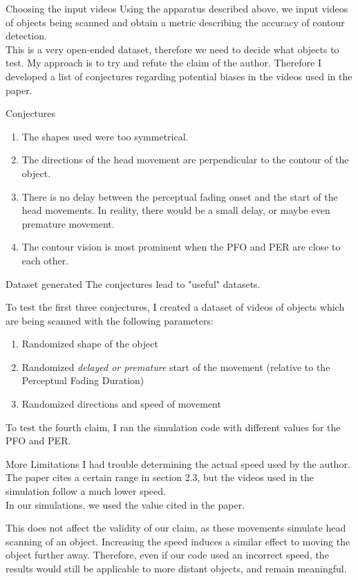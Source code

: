 \documentclass[]{beamer}
\theoremstyle{remark}
\begin{document}
\begin{frame}{Choosing the input videos}
Using the apparatus described above, we input videos of objects being scanned and obtain a metric describing the accuracy of contour detection. \\

This is a very open-ended dataset, therefore we need to decide what objects to test. My approach is to try and refute the claim of the author. Therefore I developed a list of conjectures regarding potential biases in the videos used in the paper. 
\end{frame}

\begin{frame}{Conjectures}
\begin{enumerate}
	\item The shapes used were too symmetrical.
	\item The directions of the head movement are perpendicular to the contour of the object.
	\item There is no delay between the perceptual fading onset and the start of the head movements. In reality, there would be a small delay, or maybe even premature movement.
	
	\item The contour vision is most prominent when the PFO and PER are close to each other.
	
\end{enumerate}
\end{frame}

\begin{frame}{Dataset generated}
The conjectures lead to "useful" datasets. 
	
To test the first three conjectures, I created a dataset of videos of objects which are being scanned with the following parameters:
\begin{enumerate}
	\item Randomized shape of the object
	\item Randomized {\it delayed or premature} start of the movement (relative to the Perceptual Fading Duration)
	\item Randomized directions and speed of movement
\end{enumerate}
To test the fourth claim, I ran the simulation code with different values for the PFO and PER.
\end{frame}

\begin{frame}{More Limitations}
I had trouble determining the actual speed used by the author. The paper cites a certain range in section 2.3, but the videos used in the simulation follow a much lower speed. \\
In our simulations, we used the value cited in the paper.

This does not affect the validity of our claim, as these movements simulate head scanning of an object. Increasing the speed induces a similar effect to moving the object further away. Therefore, even if our code used an incorrect speed, the results would still be applicable to more distant objects, and remain meaningful.
\end{frame}
\end{document}
